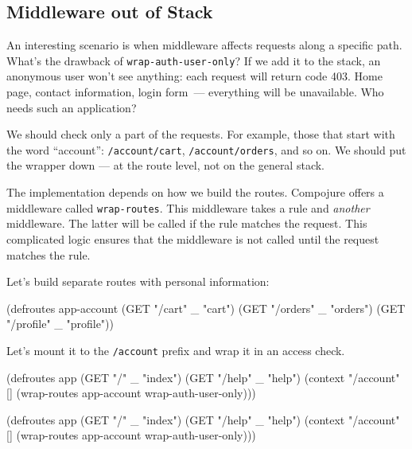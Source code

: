 \subsection{Middleware out of Stack}


An interesting scenario is when middleware affects requests along a specific path. What's the drawback of \verb|wrap-auth-user-only|? If we add it to the stack, an anonymous user won't see anything: each request will return code 403. Home page, contact information, login form~--- everything will be unavailable. Who needs such an application?

We should check only a part of the requests. For example, those that start with the word ``account'': \verb|/account/cart|, \verb|/account/orders|, and so on. We should put the wrapper down — at the route level, not on the general stack.

The implementation depends on how we build the routes. Compojure offers a middleware called \verb|wrap-routes|. This middleware takes a rule and \emph{another} middleware. The latter will be called if the rule matches the request. This complicated logic ensures that the middleware is not called until the request matches the rule.

Let's build separate routes with personal information:

\begin{clojure}
(defroutes app-account
  (GET "/cart"    _ "cart")
  (GET "/orders"  _ "orders")
  (GET "/profile" _ "profile"))
\end{clojure}

\noindent Let's mount it to the \verb|/account| prefix and wrap it in an access check.

\ifx\DEVICETYPE\MOBILE

\begin{clojure}
(defroutes app
  (GET "/"     _ "index")
  (GET "/help" _ "help")
  (context "/account" []
    (wrap-routes app-account
                 wrap-auth-user-only)))
\end{clojure}

\else

\begin{clojure}
(defroutes app
  (GET "/"     _ "index")
  (GET "/help" _ "help")
  (context "/account" []
    (wrap-routes app-account wrap-auth-user-only)))
\end{clojure}

\fi


